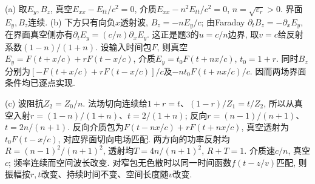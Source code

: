 \begin{solution}
(a) 取$E_y,B_z$, 真空$E_{xx}-E_{tt}/c^2=0$, 介质$E_{xx}-n^2E_{tt}/c^2=0$, $n=\sqrt{\varepsilon_r}>0$. 界面$E_y,B_z$连续. (b) 下方只有向负$x$透射波, $B_z=-nE_y/c$; 由Faraday $\partial_tB_z=-\partial_xE_y$, 在界面真空侧亦有$\partial_tE_y=(c/n)\partial_xE_y$. 这正是题3的$u=c/n$边界, 取$v=c$给反射系数$(1-n)/(1+n)$. 设输入时间包$F$, 则真空$E_y=F(t+x/c)+rF(t-x/c)$, 介质$E_y=t_0F(t+nx/c)$, $t_0=1+r$. 同时$B_z$分别为$[-F(t+x/c)+rF(t-x/c)]/c$及$-nt_0F(t+nx/c)/c$. 因而两场界面条件均已逐点实现.\par
(c) 波阻抗$Z_2=Z_0/n$. 法场切向连续给$1+r=t$、$(1-r)/Z_1=t/Z_2$, 所以从真空入射$r=(1-n)/(1+n)$、$t=2/(1+n)$; 反向$r=(n-1)/(n+1)$、$t=2n/(n+1)$. 反向介质包为$F(t-nx/c)+rF(t+nx/c)$, 真空透射为$t_0F(t-x/c)$, 对应界面切向电场匹配. 两方向的功率反射均$R=(n-1)^2/(n+1)^2$, 透射均$T=4n/(n+1)^2$, $R+T=1$. 介质速$c/n$, 真空$c$; 频率连续而空间波长改变. 对窄包无色散时以同一时间函数$f(t-z/v)$匹配, 则振幅按$r,t$改变、持续时间不变、空间长度随$v$改变.
\end{solution}
